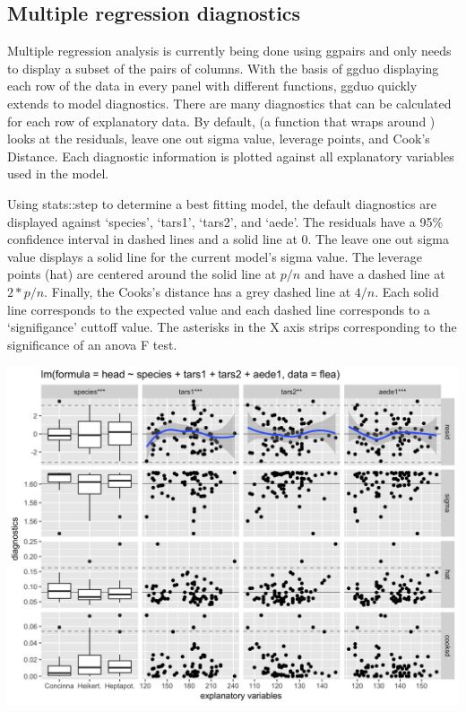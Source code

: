 \documentclass[article]{jss}
\begin{document}
\subsection{Multiple regression diagnostics}


Multiple regression analysis is currently being done using ggpairs and only needs to display a subset of the pairs of columns.
With the basis of ggduo displaying each row of the data in every panel with different functions, ggduo quickly extends to model diagnostics.
There are many diagnostics that can be calculated for each row of explanatory data.
By default,  (a function that wraps around ) looks at the residuals, leave one out sigma value, leverage points, and Cook's Distance.
Each diagnostic information is plotted against all explanatory variables used in the model.

Using stats::step to determine a best fitting model, the default diagnostics are displayed against `species', `tars1', `tars2', and `aede'.
The residuals have a 95\% confidence interval in dashed lines and a solid line at 0.
The leave one out sigma value displays a solid line for the current model's sigma value.
The leverage points (hat) are centered around the solid line at $p / n$ and have a dashed line at $2 * p / n$.
Finally, the Cooks's distance has a grey dashed line at $4 / n$.
Each solid line corresponds to the expected value and each dashed line corresponds to a `signifigance' cuttoff value.
The asterisks in the X axis strips corresponding to the significance of an anova F test.

\includegraphics{imgs/ggnostic_plain.png}
\end{document}
